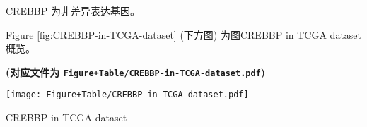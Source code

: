 \documentclass[
]{article}
\begin{document}
CREBBP 为非差异表达基因。

Figure \ref{fig:CREBBP-in-TCGA-dataset} (下方图) 为图CREBBP in TCGA dataset概览。

\textbf{(对应文件为 \texttt{Figure+Table/CREBBP-in-TCGA-dataset.pdf})}

\def\@captype{figure}
\begin{center}
\texttt{[image: Figure+Table/CREBBP-in-TCGA-dataset.pdf]}
\caption{CREBBP in TCGA dataset}\label{fig:CREBBP-in-TCGA-dataset}
\end{center}
\end{document}
